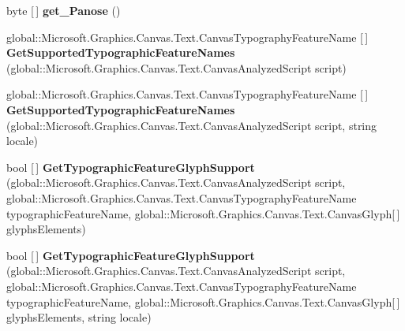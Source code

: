 \begin{DoxyCompactItemize}
\item 
\mbox{\label{interface_microsoft_1_1_graphics_1_1_canvas_1_1_text_1_1_i_canvas_font_face_ac7be86dad891579aead7f004b66c982b}} 
byte \mbox{[}$\,$\mbox{]} {\bfseries get\+\_\+\+Panose} ()
\item 
\mbox{\label{interface_microsoft_1_1_graphics_1_1_canvas_1_1_text_1_1_i_canvas_font_face_a01f36f433afb1083c97290d046937f8d}} 
global\+::\+Microsoft.\+Graphics.\+Canvas.\+Text.\+Canvas\+Typography\+Feature\+Name \mbox{[}$\,$\mbox{]} {\bfseries Get\+Supported\+Typographic\+Feature\+Names} (global\+::\+Microsoft.\+Graphics.\+Canvas.\+Text.\+Canvas\+Analyzed\+Script script)
\item 
\mbox{\label{interface_microsoft_1_1_graphics_1_1_canvas_1_1_text_1_1_i_canvas_font_face_ab214ca68fc058daaf2086d1a25bb9ed0}} 
global\+::\+Microsoft.\+Graphics.\+Canvas.\+Text.\+Canvas\+Typography\+Feature\+Name \mbox{[}$\,$\mbox{]} {\bfseries Get\+Supported\+Typographic\+Feature\+Names} (global\+::\+Microsoft.\+Graphics.\+Canvas.\+Text.\+Canvas\+Analyzed\+Script script, string locale)
\item 
\mbox{\label{interface_microsoft_1_1_graphics_1_1_canvas_1_1_text_1_1_i_canvas_font_face_a3ca04097c0081b708308456e13b4e899}} 
bool \mbox{[}$\,$\mbox{]} {\bfseries Get\+Typographic\+Feature\+Glyph\+Support} (global\+::\+Microsoft.\+Graphics.\+Canvas.\+Text.\+Canvas\+Analyzed\+Script script, global\+::\+Microsoft.\+Graphics.\+Canvas.\+Text.\+Canvas\+Typography\+Feature\+Name typographic\+Feature\+Name, global\+::\+Microsoft.\+Graphics.\+Canvas.\+Text.\+Canvas\+Glyph\mbox{[}$\,$\mbox{]} glyphs\+Elements)
\item 
\mbox{\label{interface_microsoft_1_1_graphics_1_1_canvas_1_1_text_1_1_i_canvas_font_face_a514a165ff64c3f1614b2f28786e28721}} 
bool \mbox{[}$\,$\mbox{]} {\bfseries Get\+Typographic\+Feature\+Glyph\+Support} (global\+::\+Microsoft.\+Graphics.\+Canvas.\+Text.\+Canvas\+Analyzed\+Script script, global\+::\+Microsoft.\+Graphics.\+Canvas.\+Text.\+Canvas\+Typography\+Feature\+Name typographic\+Feature\+Name, global\+::\+Microsoft.\+Graphics.\+Canvas.\+Text.\+Canvas\+Glyph\mbox{[}$\,$\mbox{]} glyphs\+Elements, string locale)

\end{DoxyCompactItemize}
